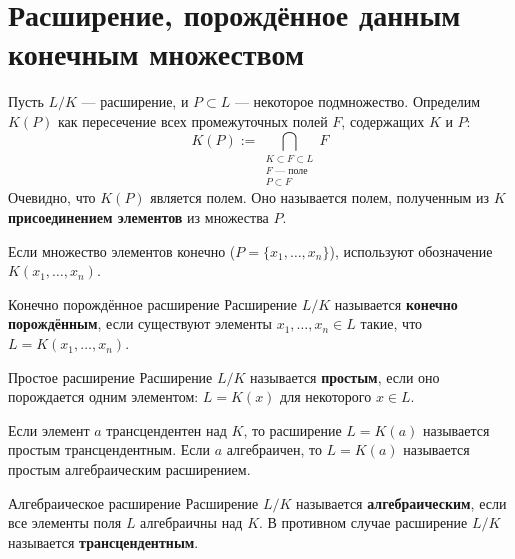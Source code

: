 
\section{Расширение, порождённое данным конечным множеством}

Пусть $L/K$ --- расширение, и $P \subset L$ --- некоторое подмножество.
Определим $K(P)$ как пересечение всех промежуточных полей $F$, содержащих $K$ и $P$:
\[ K(P) := \bigcap_{\substack{K \subset F \subset L \\ F \text{ --- поле} \\ P \subset F}} F \]
Очевидно, что $K(P)$ является полем. Оно называется полем, полученным из $K$ \textbf{присоединением элементов} из множества $P$.

Если множество элементов конечно ($P = \{x_1, \dots, x_n\}$), используют обозначение $K(x_1, \dots, x_n)$.

\begin{Definition}{Конечно порождённое расширение}{}
	Расширение $L/K$ называется \textbf{конечно порождённым}, если существуют элементы $x_1, \dots, x_n \in L$ такие, что $L = K(x_1, \dots, x_n)$.
\end{Definition}

\begin{Definition}{Простое расширение}{}
	Расширение $L/K$ называется \textbf{простым}, если оно порождается одним элементом: $L = K(x)$ для некоторого $x \in L$.
\end{Definition}

\begin{Remark}{}{}
	Если элемент $a$ трансцендентен над $K$, то расширение $L = K(a)$ называется простым трансцендентным.
	Если $a$ алгебраичен, то $L = K(a)$ называется простым алгебраическим расширением.
\end{Remark}

\begin{Definition}{Алгебраическое расширение}{}
	Расширение $L/K$ называется \textbf{алгебраическим}, если все элементы поля $L$ алгебраичны над $K$. В противном случае расширение $L/K$ называется \textbf{трансцендентным}.
\end{Definition}
